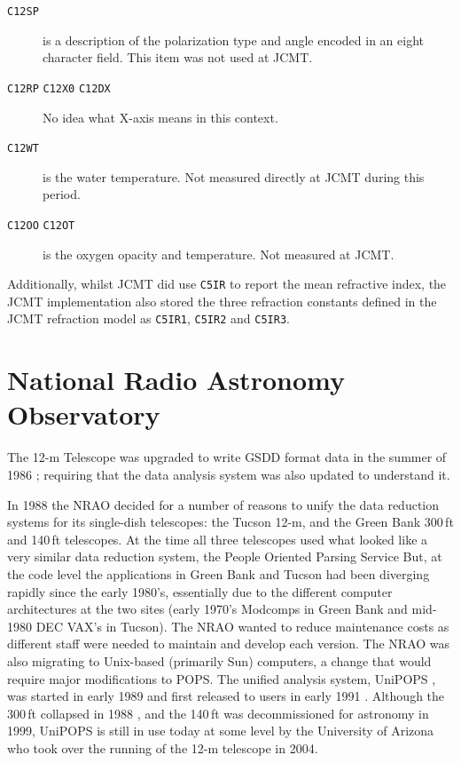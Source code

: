 \documentclass[final,authoryear,5p,times,twocolumn]{elsarticle}
\newcommand{\ascl}[1]{\href{http://www.ascl.net/#1}{ascl:#1}}
\begin{document}
\begin{description}
\item[\texttt{C12SP}] is a description of the polarization type and
  angle encoded in an eight character field. This item was not used at
  JCMT.

\item[\texttt{C12RP} \texttt{C12X0} \texttt{C12DX}] {\color{red} No
    idea what X-axis means in this context.}

\item[\texttt{C12WT}] is the water temperature. Not measured directly
  at JCMT during this period.

\item[\texttt{C12OO} \texttt{C12OT}] is the oxygen opacity and
  temperature. Not measured at JCMT.

\end{description}

Additionally, whilst JCMT did use \texttt{C5IR} to report the mean
refractive index, the JCMT implementation also stored the three refraction constants
defined in the JCMT refraction model \citep{mtin26} as \texttt{C5IR1}, \texttt{C5IR2}
and \texttt{C5IR3}.

\section{National Radio Astronomy Observatory}


The 12-m Telescope was upgraded to write GSDD format data in the
summer of 1986 \citep{tcus23,1987NRAO30}; requiring that the data
analysis system was also updated to understand it.

In 1988 the NRAO decided for a number of reasons to unify the data
reduction systems for its single-dish telescopes: the Tucson 12-m, and
the Green Bank 300\,ft and 140\,ft telescopes.  At the time all three
telescopes used what looked like a very similar data reduction system,
the People Oriented Parsing Service \citep[POPS;][]{1982POPS}
But, at the code level the applications in Green Bank
and Tucson had been diverging rapidly since the early 1980's,
essentially due to the different computer architectures at the two
sites (early 1970's Modcomps in Green Bank and mid-1980 DEC VAX's in
Tucson).  The NRAO wanted to reduce maintenance costs as different
staff were needed to maintain and develop each version.  The NRAO was
also migrating to Unix-based (primarily Sun) computers, a change that
would require major modifications to POPS. The unified analysis system, UniPOPS
\citep[][\ascl{1503.007}]{UNIPOPS}, was started in early 1989 and first released to users in early
1991 \citep{1991BAAS...23..535V}.  Although the 300\,ft collapsed in
1988 \citep{1990BAAS...22..487V}, and the 140\,ft was
decommissioned for astronomy in 1999, UniPOPS is still in use today at
some level by the University of Arizona who took over the running of
the 12-m telescope in 2004.
\end{document}
